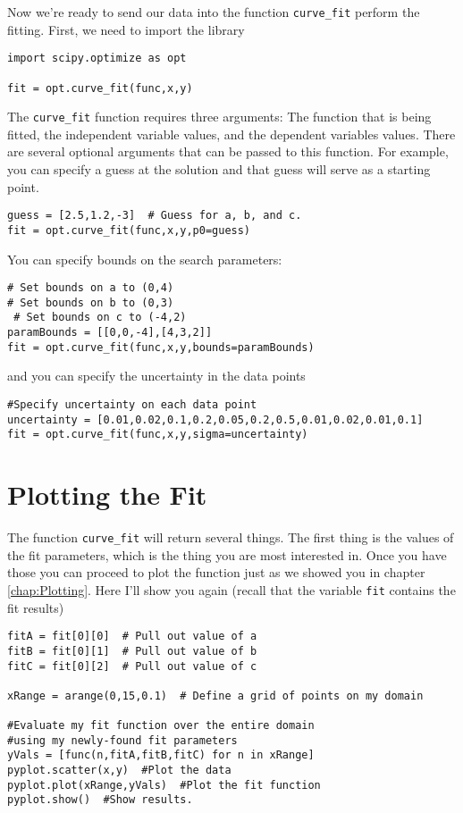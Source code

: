 Now we're ready to send our data into the function \texttt{curve\_fit}
perform the fitting. First, we need to import the library
\begin{Verbatim}
import scipy.optimize as opt

fit = opt.curve_fit(func,x,y)
\end{Verbatim}
The \texttt{curve\_fit} function requires three arguments: The function
that is being fitted, the independent variable values, and the
dependent variables values.  There are several optional arguments that
can be passed to this function.  For example, you can specify a guess
at the solution and that guess will serve as a starting
point.
\begin{Verbatim}
guess = [2.5,1.2,-3]  # Guess for a, b, and c.
fit = opt.curve_fit(func,x,y,p0=guess)
\end{Verbatim}
You can specify bounds on the search parameters:
\begin{Verbatim}
# Set bounds on a to (0,4)
# Set bounds on b to (0,3)
 # Set bounds on c to (-4,2)
paramBounds = [[0,0,-4],[4,3,2]] 
fit = opt.curve_fit(func,x,y,bounds=paramBounds)
\end{Verbatim}
and you can specify the uncertainty in the data points
\begin{Verbatim}
#Specify uncertainty on each data point
uncertainty = [0.01,0.02,0.1,0.2,0.05,0.2,0.5,0.01,0.02,0.01,0.1]  
fit = opt.curve_fit(func,x,y,sigma=uncertainty)
\end{Verbatim}

\section{Plotting the Fit}
The function \texttt{curve\_fit} will return several things.  The
first thing is the values of the fit parameters, which is the thing
you are most interested in.  Once you have those you can proceed to
plot the function just as we showed you in chapter \ref{chap:Plotting}.
Here I'll show you again (recall that the variable \texttt{fit}
contains the fit results)
\begin{Verbatim}
fitA = fit[0][0]  # Pull out value of a
fitB = fit[0][1]  # Pull out value of b
fitC = fit[0][2]  # Pull out value of c

xRange = arange(0,15,0.1)  # Define a grid of points on my domain

#Evaluate my fit function over the entire domain
#using my newly-found fit parameters
yVals = [func(n,fitA,fitB,fitC) for n in xRange] 
pyplot.scatter(x,y)  #Plot the data
pyplot.plot(xRange,yVals)  #Plot the fit function
pyplot.show()  #Show results.
\end{Verbatim}